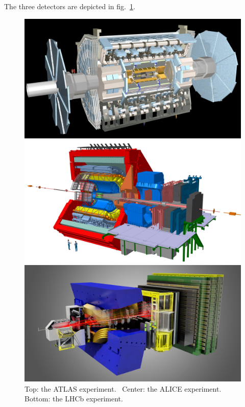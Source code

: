 \vspace*{1\baselineskip}

\noindent The three detectors are depicted in fig.~\ref{fig:ATLAS-ALICE-LHCb}.%


\begin{figure}%
\centering
\includegraphics[width=.65\textwidth]{figures/ATLAS.jpg}

\includegraphics[width=.65\textwidth]{figures/ALICE.jpg}

\includegraphics[width=.65\textwidth]{figures/LHCb.png}

\caption{Top: the ATLAS experiment.~\cite{Aad:2008zzm} Center: the ALICE experiment.~\cite{Aamodt:2008zz} Bottom: the LHCb experiment.~\cite{Alves:2008zz}}
\label{fig:ATLAS-ALICE-LHCb}
\end{figure}

\clearpage
